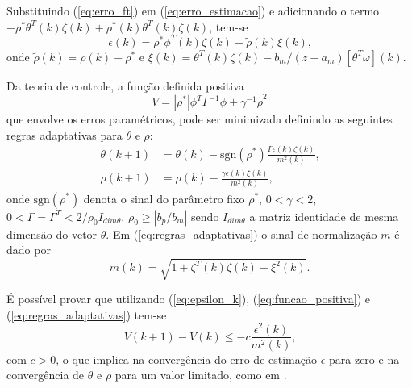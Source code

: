     Substituindo (\ref{eq:erro_ft}) em (\ref{eq:erro_estimacao}) e adicionando o termo $-\rho^* \theta^T (k) \zeta (k) + \rho^* (k) \theta^T (k) \zeta(k)$, tem-se
    \begin{equation}
        \epsilon(k) = \rho^* \phi^T(k) \zeta(k) + \tilde{\rho}(k) \xi(k) \text{,}
        \label{eq:epsilon_k}
    \end{equation}
    onde $\tilde{\rho}(k) = \rho(k) - \rho^*$ e $\xi(k) = \theta^T(k) \zeta(k) - b_m / (z - a_m)[\theta^T \omega](k)$.

    Da teoria de controle, a função definida positiva
    \begin{equation}
        V = |\rho^*| \phi^T \Gamma^{-1} \phi + \gamma^{-1} {\tilde{\rho}}^2
        \label{eq:funcao_positiva}
    \end{equation}
    que envolve os erros paramétricos, pode ser minimizada definindo as seguintes regras adaptativas para $\theta$ e $\rho$:
    \begin{subequations}
        \begin{align}
            \theta(k + 1) & = \theta(k) - \text{sgn}(\rho^*)\frac{\Gamma \epsilon(k)\zeta(k)}{m^2(k)} \text{,}\\
            \rho(k + 1) & = \rho(k) - \frac{\gamma \epsilon(k) \xi(k)}{m^2(k)} \text{,}
        \end{align}
        \label{eq:regras_adaptativas}
    \end{subequations}
    onde $\text{sgn}(\rho^*)$ denota o sinal do parâmetro fixo $\rho^*$, $0 < \gamma < 2$, $0 < \Gamma = \Gamma^T < 2/\rho_0 I_{dim \theta}$, $\rho_0 \geq |b_p / b_m|$ sendo $I_{dim \theta}$ a matriz identidade de mesma dimensão do vetor $\theta$. Em (\ref{eq:regras_adaptativas}) o sinal de normalização $m$ é dado por
    \begin{equation}
        m(k) = \sqrt{1 + \zeta^T(k) \zeta(k) + \xi^2(k)} \text{.}
    \end{equation}

    É possível provar que utilizando (\ref{eq:epsilon_k}), (\ref{eq:funcao_positiva}) e (\ref{eq:regras_adaptativas}) tem-se
    \begin{equation}
        V(k + 1) - V(k) \leq -c \frac{\epsilon^2(k)}{m^2(k)} \text{,}
    \end{equation}
    com $c > 0$, o que implica na convergência do erro de estimação $\epsilon$ para zero e na convergência de $\theta$ e $\rho$ para um valor limitado, como em \cite{ref:TAO}.

